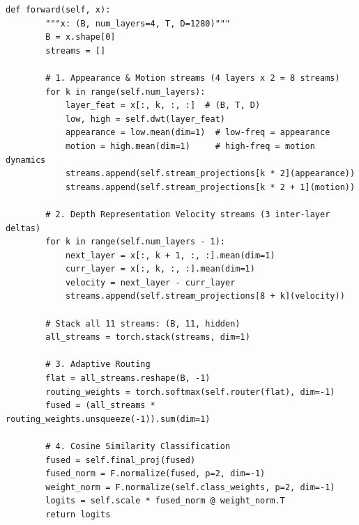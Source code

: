 \begin{lstlisting}[caption={HAF-STD Net architecture and spectral-temporal decomposition (HMDB51 configuration).}, label={lst:hafstd_arch}]
    def forward(self, x):
        """x: (B, num_layers=4, T, D=1280)"""
        B = x.shape[0]
        streams = []

        # 1. Appearance & Motion streams (4 layers x 2 = 8 streams)
        for k in range(self.num_layers):
            layer_feat = x[:, k, :, :]  # (B, T, D)
            low, high = self.dwt(layer_feat)
            appearance = low.mean(dim=1)  # low-freq = appearance
            motion = high.mean(dim=1)     # high-freq = motion dynamics
            streams.append(self.stream_projections[k * 2](appearance))
            streams.append(self.stream_projections[k * 2 + 1](motion))

        # 2. Depth Representation Velocity streams (3 inter-layer deltas)
        for k in range(self.num_layers - 1):
            next_layer = x[:, k + 1, :, :].mean(dim=1)
            curr_layer = x[:, k, :, :].mean(dim=1)
            velocity = next_layer - curr_layer
            streams.append(self.stream_projections[8 + k](velocity))

        # Stack all 11 streams: (B, 11, hidden)
        all_streams = torch.stack(streams, dim=1)

        # 3. Adaptive Routing
        flat = all_streams.reshape(B, -1)
        routing_weights = torch.softmax(self.router(flat), dim=-1)
        fused = (all_streams * routing_weights.unsqueeze(-1)).sum(dim=1)

        # 4. Cosine Similarity Classification
        fused = self.final_proj(fused)
        fused_norm = F.normalize(fused, p=2, dim=-1)
        weight_norm = F.normalize(self.class_weights, p=2, dim=-1)
        logits = self.scale * fused_norm @ weight_norm.T
        return logits
\end{lstlisting}

